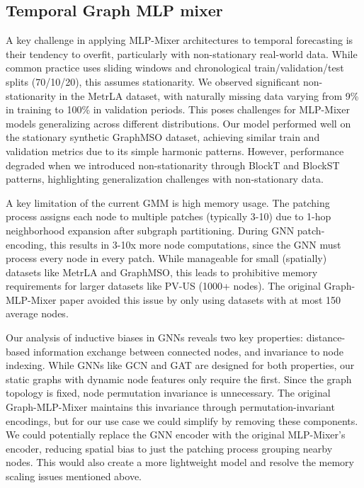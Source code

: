 \documentclass{article}
\theoremstyle{plain}
\theoremstyle{definition}
\theoremstyle{remark}
\begin{document}
\subsection{Temporal Graph MLP mixer}

A key challenge in applying MLP-Mixer architectures to temporal forecasting is their tendency to overfit, particularly with non-stationary real-world data. While common practice uses sliding windows and chronological train/validation/test splits (70/10/20), this assumes stationarity. We observed significant non-stationarity in the MetrLA dataset, with naturally missing data varying from 9\% in training to 100\% in validation periods. This poses challenges for MLP-Mixer models generalizing across different distributions. Our model performed well on the stationary synthetic GraphMSO dataset, achieving similar train and validation metrics due to its simple harmonic patterns. However, performance degraded when we introduced non-stationarity through BlockT and BlockST patterns, highlighting generalization challenges with non-stationary data.

A key limitation of the current GMM is high memory usage. The patching process assigns each node to multiple patches (typically 3-10) due to 1-hop neighborhood expansion after subgraph partitioning. During GNN patch-encoding, this results in 3-10x more node computations, since the GNN must process every node in every patch. While manageable for small (spatially) datasets like MetrLA and GraphMSO, this leads to prohibitive memory requirements for larger datasets like PV-US (1000+ nodes). The original Graph-MLP-Mixer paper avoided this issue by only using datasets with at most 150 average nodes.

Our analysis of inductive biases in GNNs reveals two key properties: distance-based information exchange between connected nodes, and invariance to node indexing. While GNNs like GCN and GAT are designed for both properties, our static graphs with dynamic node features only require the first. Since the graph topology is fixed, node permutation invariance is unnecessary. The original Graph-MLP-Mixer maintains this invariance through permutation-invariant encodings, but for our use case we could simplify by removing these components. We could potentially replace the GNN encoder with the original MLP-Mixer's encoder, reducing spatial bias to just the patching process grouping nearby nodes. This would also create a more lightweight model and resolve the memory scaling issues mentioned above.
\end{document}
